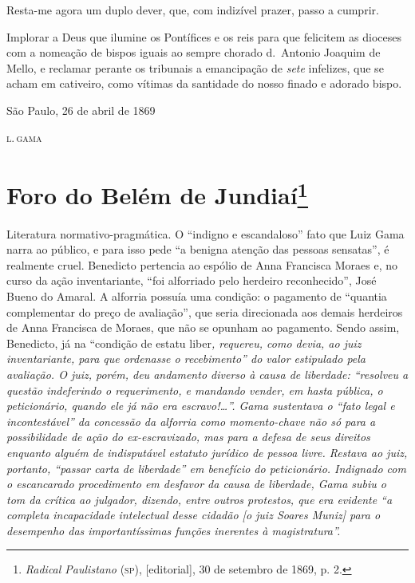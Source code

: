 Resta-me agora um duplo dever, que, com indizível prazer, passo a
cumprir.

Implorar a Deus que ilumine os Pontífices e os reis para que felicitem
as dioceses com a nomeação de bispos iguais ao sempre chorado d.~Antonio
Joaquim de Mello, e reclamar perante os tribunais a emancipação de
\emph{sete} infelizes, que se acham em cativeiro, como vítimas da
santidade do nosso finado e adorado bispo.

\begin{flushright}
São Paulo, 26 de abril de 1869

\textsc{l.\,gama}
\end{flushright}

\chapter{Foro do Belém de Jundiaí\footnote{\emph{Radical Paulistano}
  (\textsc{sp}), {[}editorial{]}, 30 de setembro de 1869, p. 2.}}

\begin{didascalia}
Literatura normativo-pragmática. O ``indigno e escandaloso'' fato que Luiz
Gama narra ao público, e para isso pede ``a benigna atenção das pessoas
sensatas'', é realmente cruel. Benedicto pertencia ao espólio de Anna
Francisca Moraes e, no curso da ação inventariante, ``foi alforriado pelo
herdeiro reconhecido'', José Bueno do Amaral. A alforria possuía uma
condição: o pagamento de ``quantia complementar do preço de avaliação'',
que seria direcionada aos demais herdeiros de Anna Francisca de Moraes,
que não se opunham ao pagamento. Sendo assim, Benedicto, já na ``condição
de estatu liber\emph{, requereu, como devia, ao juiz inventariante,
para que ordenasse o recebimento'' do valor estipulado pela avaliação. O
juiz, porém, deu andamento diverso à causa de liberdade: ``resolveu a
questão indeferindo o requerimento, e mandando vender, em hasta pública,
o peticionário, quando ele já não era escravo!\ldots{}''. Gama sustentava o
``fato legal e incontestável'' da concessão da alforria como momento-chave
não só para a possibilidade de ação do ex-escravizado, mas para a defesa
de seus direitos enquanto alguém de indisputável estatuto jurídico de
pessoa livre. Restava ao juiz, portanto, ``passar carta de liberdade'' em
benefício do peticionário. Indignado com o escancarado procedimento em
desfavor da causa de liberdade, Gama subiu o tom da crítica ao julgador,
dizendo, entre outros protestos, que era evidente ``a completa
incapacidade intelectual desse cidadão {[}o juiz Soares Muniz{]} para o
desempenho das importantíssimas funções inerentes à magistratura''.}
\end{didascalia}



